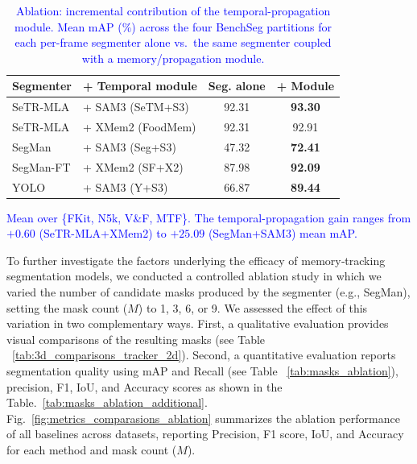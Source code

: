 \documentclass[preprint,12pt]{elsarticle}
\newcommand{\change}[1]{\textcolor{blue}{#1}}
\begin{document}
\begin{table}[t]
\centering
\small
\setlength{\tabcolsep}{6pt}
\caption{\change{Ablation: incremental contribution of the temporal-propagation module. Mean mAP (\%) across the four BenchSeg partitions for each per-frame segmenter alone vs.\ the same segmenter coupled with a memory/propagation module.}}
\label{tab:temporal_module_ablation}
\begin{tabular}{llcc}
\toprule
\textbf{Segmenter} & \textbf{+ Temporal module} & \textbf{Seg. alone} & \textbf{+ Module} \\
\midrule
SeTR-MLA  & + SAM3 (SeTM+S3)   & 92.31 & \textbf{93.30} \\
\rowcolor{gray!12}SeTR-MLA  & + XMem2 (FoodMem)  & 92.31 & 92.91 \\
SegMan    & + SAM3 (Seg+S3)    & 47.32 & \textbf{72.41} \\
\rowcolor{gray!12}SegMan-FT & + XMem2 (SF+X2)    & 87.98 & \textbf{92.09} \\
YOLO      & + SAM3 (Y+S3)      & 66.87 & \textbf{89.44} \\
\bottomrule
\end{tabular}

\vspace{2pt}
\raggedright
\footnotesize
\change{Mean over \{FKit, N5k, V\&F, MTF\}. The temporal-propagation gain ranges from $+0.60$ (SeTR-MLA+XMem2) to $+25.09$ (SegMan+SAM3) mean mAP.}
\end{table}

To further investigate the factors underlying the efficacy of memory‑tracking segmentation models, we conducted a controlled ablation study in which we varied the number of candidate masks produced by the segmenter (e.g., SegMan), setting the mask count ($M$) to 1, 3, 6, or 9. We assessed the effect of this variation in two complementary ways. First, a qualitative evaluation provides visual comparisons of the resulting masks (see Table ~\ref{tab:3d_comparisons_tracker_2d}). Second, a quantitative evaluation reports segmentation quality using mAP and Recall (see Table ~\ref{tab:masks_ablation}), precision, F1, IoU, and Accuracy scores as shown in the Table.~\ref{tab:masks_ablation_additional}. Fig.~\ref{fig:metrics_comparasions_ablation} summarizes the ablation performance of all baselines across datasets, reporting Precision, F1 score, IoU, and Accuracy for each method and mask count ($M$).
\end{document}
